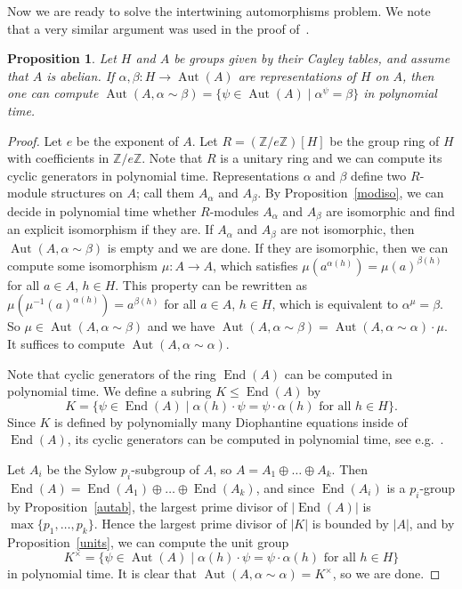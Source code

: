 \documentclass{article}
\newtheorem{proposition}[theorem]{Proposition}
\DeclareMathOperator{\Aut}{Aut}
\DeclareMathOperator{\End}{End}
\begin{document}
Now we are ready to solve the intertwining automorphisms problem. We note that a very similar argument was
used in the proof of~\cite[Proposition~5.1]{skres}.

\begin{proposition}\label{pbot}
	Let \( H \) and \( A \) be groups given by their Cayley tables, and assume that \( A \) is abelian.
	If \( \alpha, \beta : H \to \Aut(A) \) are representations of \( H \) on \( A \), then one can compute
	\( \Aut(A,\alpha \sim \beta) = \{ \psi \in \Aut(A) \mid \alpha^\psi = \beta \} \) in polynomial time.
\end{proposition}
\begin{proof}
	Let \( e \) be the exponent of \( A \). Let \( R = (\mathbb{Z}/e\mathbb{Z})[H] \) be the group ring of \( H \) with
	coefficients in \( \mathbb{Z}/e\mathbb{Z} \). Note that \( R \) is a unitary ring and we can compute its cyclic generators
	in polynomial time. Representations \( \alpha \) and \( \beta \) define two \( R \)-module structures on \( A \);
	call them \( A_\alpha \) and \( A_\beta \).
	By Proposition~\ref{modiso}, we can decide in polynomial time whether \( R \)-modules \( A_\alpha \) and \( A_\beta \) are isomorphic and find an
	explicit isomorphism if they are. If \( A_\alpha \) and \( A_\beta \) are not isomorphic, then \( \Aut(A, \alpha \sim \beta) \)
	is empty and we are done. If they are isomorphic, then we can compute some isomorphism \( \mu : A \to A \), which satisfies
	\( \mu(a^{\alpha(h)}) = \mu(a)^{\beta(h)} \) for all \( a \in A \), \( h \in H \).
	This property can be rewritten as \( \mu(\mu^{-1}(a)^{\alpha(h)}) = a^{\beta(h)} \) for all \( a \in A \), \( h \in H \),
	which is equivalent to \( \alpha^\mu = \beta \). So \( \mu \in \Aut(A, \alpha \sim \beta) \) and we have
	\( \Aut(A, \alpha \sim \beta) = \Aut(A, \alpha \sim \alpha) \cdot \mu \). It suffices to compute \( \Aut(A, \alpha \sim \alpha) \).

	Note that cyclic generators of the ring \( \End(A) \) can be computed in polynomial time.
	We define a subring \( K \leq \End(A) \) by
	\[ K = \{ \psi \in \End(A) \mid \alpha(h) \cdot \psi = \psi \cdot \alpha(h) \text{ for all } h \in H \}. \]
	Since \( K \) is defined by polynomially many Diophantine equations inside of \( \End(A) \), its cyclic generators
	can be computed in polynomial time, see e.g.~\cite{dio1, dio2}.

	Let \( A_i \) be the Sylow \( p_i \)-subgroup of \( A \), so \( A = A_1 \oplus \dots \oplus A_k \).
	Then \( \End(A) = \End(A_1) \oplus \dots \oplus \End(A_k) \), and since \( \End(A_i) \) is a \( p_i \)-group
	by Proposition~\ref{autab}, the largest prime divisor of \( |\End(A)| \) is \( \max \{ p_1, \dots, p_k \} \).
	Hence the largest prime divisor of \( |K| \) is bounded by \( |A| \), and by Proposition~\ref{units}, we can compute the unit group
	\[ K^\times = \{ \psi \in \Aut(A) \mid \alpha(h) \cdot \psi = \psi \cdot \alpha(h) \text{ for all } h \in H \} \]
	in polynomial time. It is clear that \( \Aut(A, \alpha \sim \alpha) = K^\times \), so we are done.
\end{proof}
\end{document}
